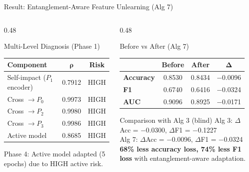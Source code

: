 \documentclass[aspectratio=169, 11pt]{beamer}
\begin{document}
\begin{frame}{Result: Entanglement-Aware Feature Unlearning (Alg 7)}
  \begin{columns}[T]
    \begin{column}{0.48\textwidth}
      \begin{block}{Multi-Level Diagnosis (Phase 1)}
        \centering
        \renewcommand{\arraystretch}{1.2}
        \begin{tabular}{>{\footnotesize}l >{\footnotesize}c >{\footnotesize}c}
          \toprule
          \textbf{Component} & $\boldsymbol{\rho}$ & \textbf{Risk} \\
          \midrule
          Self-impact ($P_1$ encoder) & 0.7912 & \textcolor{accentred}{HIGH} \\
          Cross $\to P_0$ & 0.9973 & \textcolor{accentred}{HIGH} \\
          Cross $\to P_2$ & 0.9980 & \textcolor{accentred}{HIGH} \\
          Cross $\to P_3$ & 0.9986 & \textcolor{accentred}{HIGH} \\
          Active model & 0.8685 & \textcolor{accentred}{HIGH} \\
          \bottomrule
        \end{tabular}
      \end{block}
      \vspace{0.1cm}
      \footnotesize
      Phase 4: Active model adapted (5 epochs) due to HIGH active risk.
    \end{column}
    \begin{column}{0.48\textwidth}
      \begin{block}{Before vs After (Alg 7)}
        \centering
        \renewcommand{\arraystretch}{1.3}
        \begin{tabular}{>{\bfseries\footnotesize}l >{\footnotesize}c >{\footnotesize}c >{\footnotesize}c}
          \toprule
          & \textbf{Before} & \textbf{After} & $\boldsymbol{\Delta}$ \\
          \midrule
          Accuracy & 0.8530 & 0.8434 & \textcolor{accentred}{$-$0.0096} \\
          F1       & 0.6740 & 0.6416 & \textcolor{accentred}{$-$0.0324} \\
          AUC      & 0.9096 & 0.8925 & \textcolor{accentred}{$-$0.0171} \\
          \bottomrule
        \end{tabular}
      \end{block}
      \vspace{0.2cm}
      \begin{alertblock}{Comparison with Alg 3 (blind)}
        \footnotesize
        Alg 3: $\Delta$Acc = $-$0.0300, $\Delta$F1 = $-$0.1227\\
        Alg 7: $\Delta$Acc = $-$0.0096, $\Delta$F1 = $-$0.0324\\[0.1cm]
        \textbf{68\% less accuracy loss, 74\% less F1 loss} with entanglement-aware adaptation.
      \end{alertblock}
    \end{column}
  \end{columns}
\end{frame}
\end{document}
